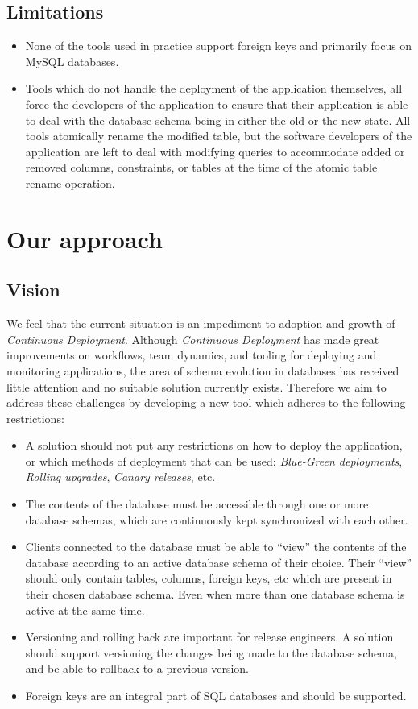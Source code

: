 \documentclass[conference]{IEEEtran}
\begin{document}
\subsection{Limitations} 

\begin{itemize}
  \item{None of the tools used in practice support foreign keys and primarily focus on MySQL databases.}
  \item{Tools which do not handle the deployment of the application themselves, all force the developers of the application to ensure that their application is able to deal with the database schema being in either the old or the new state. All tools atomically rename the modified table, but the software developers of the application are left to deal with modifying queries to accommodate added or removed columns, constraints, or tables at the time of the atomic table rename operation.}
\end{itemize}

\section{Our approach} %

\subsection{Vision}

We feel that the current situation is an impediment to adoption and growth of \textit{Continuous Deployment}. Although \textit{Continuous Deployment} has made great improvements on workflows, team dynamics, and tooling for deploying and monitoring applications, the area of schema evolution in databases has received little attention and no suitable solution currently exists. Therefore we aim to address these challenges by developing a new tool which adheres to the following restrictions:

\begin{itemize}
  \item{A solution should not put any restrictions on how to deploy the application, or which methods of deployment that can be used: \textit{Blue-Green deployments}, \textit{Rolling upgrades}, \textit{Canary releases}, etc.}
  \item{The contents of the database must be accessible through one or more database schemas, which are continuously kept synchronized with each other.}
  \item{Clients connected to the database must be able to ``view'' the contents of the database according to an active database schema of their choice. Their ``view'' should only contain tables, columns, foreign keys, etc which are present in their chosen database schema. Even when more than one database schema is active at the same time.}
  \item{Versioning and rolling back are important for release engineers. A solution should support versioning the changes being made to the database schema, and be able to rollback to a previous version.}
  \item{Foreign keys are an integral part of SQL databases and should be supported.}
\end{itemize}
\end{document}
